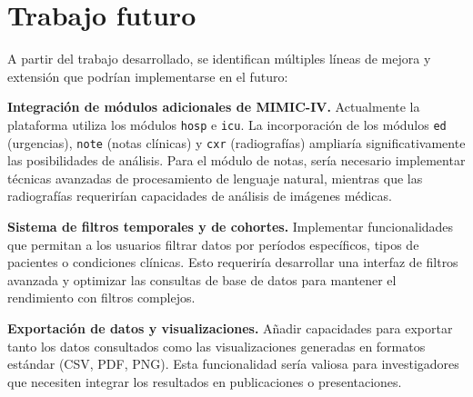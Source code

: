 \newpage
\section{Trabajo futuro}

A partir del trabajo desarrollado, se identifican múltiples líneas de mejora y extensión que podrían implementarse en el futuro:



\textbf{Integración de módulos adicionales de MIMIC-IV.} Actualmente la plataforma utiliza los módulos \texttt{hosp} e \texttt{icu}. La incorporación de los módulos \texttt{ed} (urgencias), \texttt{note} (notas clínicas) y \texttt{cxr} (radiografías) ampliaría significativamente las posibilidades de análisis. Para el módulo de notas, sería necesario implementar técnicas avanzadas de procesamiento de lenguaje natural, mientras que las radiografías requerirían capacidades de análisis de imágenes médicas.

\textbf{Sistema de filtros temporales y de cohortes.} Implementar funcionalidades que permitan a los usuarios filtrar datos por períodos específicos, tipos de pacientes o condiciones clínicas. Esto requeriría desarrollar una interfaz de filtros avanzada y optimizar las consultas de base de datos para mantener el rendimiento con filtros complejos.

\textbf{Exportación de datos y visualizaciones.} Añadir capacidades para exportar tanto los datos consultados como las visualizaciones generadas en formatos estándar (CSV, PDF, PNG). Esta funcionalidad sería valiosa para investigadores que necesiten integrar los resultados en publicaciones o presentaciones.








